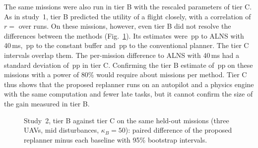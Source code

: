 The same  missions were also run in tier B with the rescaled parameters of tier C. As in study~1, tier B
predicted the utility of a flight closely, with a correlation of $r=$  over  runs. On these
missions, however, even tier B did not resolve the differences between the methods (Fig.~\ref{fig:s2bc}). Its estimates
were \,pp to ALNS with 40\,ms, \,pp to the constant buffer and \,pp to the
conventional planner. The tier C intervals overlap them. The per-mission difference to ALNS with 40\,ms had a standard
deviation of \,pp in tier C. Confirming the tier B estimate of \,pp on these missions with
a power of 80\% would require about  missions per method. Tier C thus shows that the proposed
replanner runs on an autopilot and a physics engine with the same computation and fewer late tasks, but it cannot
confirm the size of the gain measured in tier B.

\begin{figure}[t]
\centering
{}
\caption{Study~2, tier B against tier C on the same  held-out missions (three UAVs, mid disturbances,
$\kappa_B=50$): paired difference of the proposed replanner minus each baseline with 95\% bootstrap intervals.}
\label{fig:s2bc}
\end{figure}
